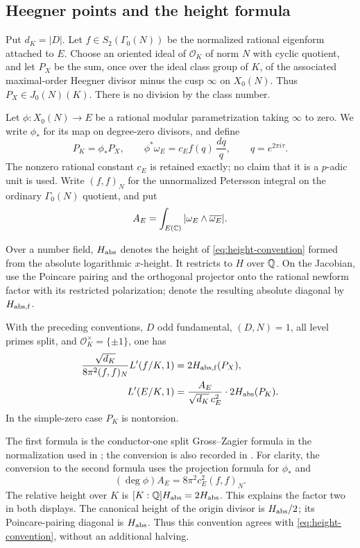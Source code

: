 \subsection{Heegner points and the height formula}

Put $d_K=|D|$. Let $f\in S_2(\Gamma_0(N))$ be the normalized
rational eigenform attached to $E$. Choose an oriented ideal of
$\mathcal O_K$ of norm $N$ with cyclic quotient, and let $P_X$
be the sum, once over the ideal class group of $K$, of the associated
maximal-order Heegner divisor minus the cusp $\infty$ on $X_0(N)$.
Thus $P_X\in J_0(N)(K)$. There is no division by the class number.

Let $\phi:X_0(N)\to E$ be a rational modular parametrization taking
$\infty$ to zero. We write $\phi_*$ for its map on degree-zero
divisors, and define
\begin{equation}\label{eq:manin-constant}
 P_K=\phi_*P_X,\qquad
 \phi^*\omega_E=c_E f(q)\,\frac{dq}{q},\qquad
 q=e^{2\pi i\tau}.
\end{equation}
The nonzero rational constant $c_E$ is retained exactly; no claim
that it is a $p$-adic unit is used. Write $(f,f)_N$ for the
unnormalized Petersson integral on the ordinary
$\Gamma_0(N)$ quotient, and put
\[
 A_E=\int_{E(\mathbb C)}|\omega_E\wedge\overline{\omega_E}|.
\]

Over a number field, $H_{\rm abs}$ denotes the height of
\eqref{eq:height-convention} formed from the absolute logarithmic
$x$-height. It restricts to $H$ over $\mathbb Q$. On the Jacobian, use
the Poincare pairing and the orthogonal projector onto the rational
newform factor with its restricted polarization; denote the
resulting absolute diagonal by $H_{\rm abs,f}$.

\begin{theorem}
\label{classical:gross-zagier}
With the preceding conventions, $D$ odd fundamental, $(D,N)=1$,
all level primes split, and $\mathcal O_K^\times=\{\pm1\}$, one has
\begin{align}
 \frac{\sqrt{d_K}}{8\pi^2(f,f)_N}L'(f/K,1)
       &=2H_{\rm abs,f}(P_X),\label{eq:classical-gz}\\
 L'(E/K,1)&=\frac{A_E}{\sqrt{d_K}\,c_E^2}\cdot
                        2H_{\rm abs}(P_K).
                                      \label{eq:classical-gz-elliptic}
\end{align}
In the simple-zero case $P_K$ is nontorsion.
\end{theorem}

The first formula is the conductor-one split Gross--Zagier formula
in the normalization used in \cite[Chapters~I and~V]{GrossZagier};
the conversion is also recorded in \cite[Section~2]{B}. For clarity,
the conversion to the second formula uses the projection formula
for $\phi_*$ and
\[
 (\deg\phi)A_E=8\pi^2c_E^2(f,f)_N.
\]
The relative height over $K$ is $[K:\mathbb Q]H_{\rm abs}=2H_{\rm abs}$.
This explains the factor two in both displays. The canonical height
of the origin divisor is $H_{\rm abs}/2$; its Poincare-pairing
diagonal is $H_{\rm abs}$. Thus this convention agrees with
\eqref{eq:height-convention}, without an additional halving.

